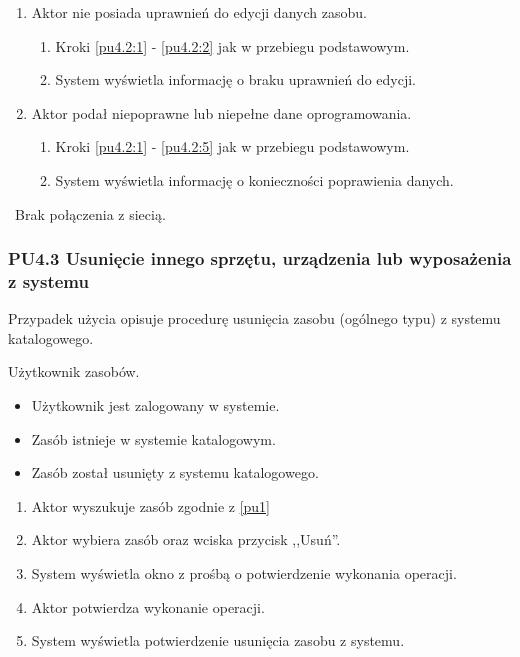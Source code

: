 \begin{enumerate}
\item Aktor nie posiada uprawnień do edycji danych zasobu.
	\begin{enumerate}[label*=\arabic*.]
		\item Kroki \ref{pu4.2:1} - \ref{pu4.2:2} jak w przebiegu podstawowym.
		\item System wyświetla informację o braku uprawnień do edycji.
	\end{enumerate}
\item Aktor podał niepoprawne lub niepełne dane oprogramowania.
	\begin{enumerate}[label*=\arabic*.]
		\item Kroki \ref{pu4.2:1} - \ref{pu4.2:5} jak w przebiegu podstawowym.
		\item System wyświetla informację o konieczności poprawienia danych.
	\end{enumerate}
\end{enumerate}

\
Brak połączenia z siecią.

\subsubsection{PU4.3 Usunięcie innego sprzętu, urządzenia lub wyposażenia z systemu}

Przypadek użycia opisuje procedurę usunięcia zasobu (ogólnego typu) z systemu katalogowego.

Użytkownik zasobów.

\begin{itemize}
\item Użytkownik jest zalogowany w systemie.
\item Zasób istnieje w systemie katalogowym.
\end{itemize}

\begin{itemize}
\item Zasób został usunięty z systemu katalogowego.
\end{itemize}

\begin{enumerate}
\item \label{pu4.3:1} Aktor wyszukuje zasób zgodnie z \ref{pu1}
\item \label{pu4.3:2} Aktor wybiera zasób oraz wciska przycisk ,,Usuń''.
\item System wyświetla okno z prośbą o potwierdzenie wykonania operacji.
\item Aktor potwierdza wykonanie operacji.
\item System wyświetla potwierdzenie usunięcia zasobu z systemu.
\end{enumerate}

